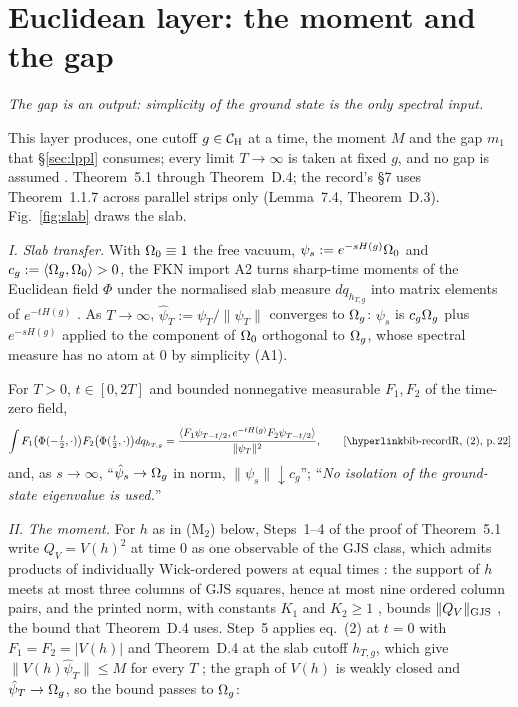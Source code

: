 \section{Euclidean layer: the moment and the gap}\label{sec:euclidean}

\emph{The gap is an output: simplicity of the ground state is the only spectral input.}

This layer produces, one cutoff $g\in\mathcal{C}_{\mathrm H}$ at a time, the moment $M$ and the gap $m_1$
that \S\ref{sec:lppl} consumes; every limit $T\to\infty$ is taken at fixed $g$, and no gap
is assumed . Theorem~5.1  through Theorem~D.4; the
record's \S7 uses Theorem~1.1.7 across parallel strips only (Lemma~7.4, Theorem~D.3).
Fig.~\ref{fig:slab} draws the slab.

\emph{I. Slab transfer.} With $\Omega_0\equiv1$ the free vacuum,
$\psi_s:=e^{-sH(g)}\Omega_0$ and $c_g:=\langle \Omega_g,\Omega_0\rangle>0$, the FKN import A2 turns
sharp-time moments of the Euclidean field $\Phi$ under the normalised slab measure
$dq_{h_{T,g}}$ into matrix elements of $e^{-tH(g)}$ . As $T\to\infty$,
$\hat\psi_T:=\psi_T/\|\psi_T\|$ converges to $\Omega_g$: $\psi_s$ is $c_g\Omega_g$ plus
$e^{-sH(g)}$ applied to the component of $\Omega_0$ orthogonal to $\Omega_g$, whose spectral
measure has no atom at $0$ by simplicity (A1).

\begin{checkpoint}
For $T>0$, $t\in[0,2T]$ and bounded nonnegative measurable $F_1,F_2$ of the time-zero
field,
\begin{equation*}
 \int F_1\bigl(\Phi(-\tfrac t2,\cdot)\bigr)F_2\bigl(\Phi(\tfrac t2,\cdot)\bigr)dq_{h_{T,g}}
 =\frac{\ip{F_1\psi_{T-t/2}}{e^{-tH(g)}F_2\psi_{T-t/2}}}{\|\psi_T\|^2},
 \tag*{\rec{(2)}{22}}
\end{equation*}
and, as $s\to\infty$, ``$\hat\psi_s\to\Omega_g$ in norm, $\|\psi_s\|\downarrow c_g$'';
``\emph{No isolation of the ground-state eigenvalue is used.}'' 
\end{checkpoint}

\emph{II. The moment.} For $h$ as in (M$_2$) below, Steps~1--4 of the proof of
Theorem~5.1 write $Q_V=V(h)^2$ at time $0$ as one observable of the GJS class, which
admits products of individually Wick-ordered powers at equal times : the
support of $h$ meets at most three columns of GJS squares, hence at most nine ordered
column pairs, and the printed norm, with constants $K_1$ and $K_2\ge1$
, bounds $\|Q_V\|_{\rm GJS}$ , the bound that
Theorem~D.4 uses.
Step~5 applies eq.~(2) at $t=0$ with $F_1=F_2=|V(h)|$ and Theorem~D.4 at the slab cutoff
$h_{T,g}$, which give $\|V(h)\hat\psi_T\|\le M$ for every $T$ ; the
graph of $V(h)$ is weakly closed and $\hat\psi_T\to\Omega_g$, so the bound passes to $\Omega_g$:

